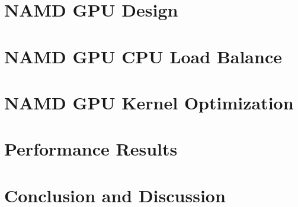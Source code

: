\documentclass[11pt,onecolumn]{article}
\newcommand{\namd}{\textsc{namd}}
\begin{document}

\section{NAMD GPU Design } 


\section{NAMD GPU CPU Load Balance}
\label{sec:balance}



\section{NAMD GPU Kernel Optimization}


\section{Performance Results}


\section{Conclusion and Discussion}




\end{document}
